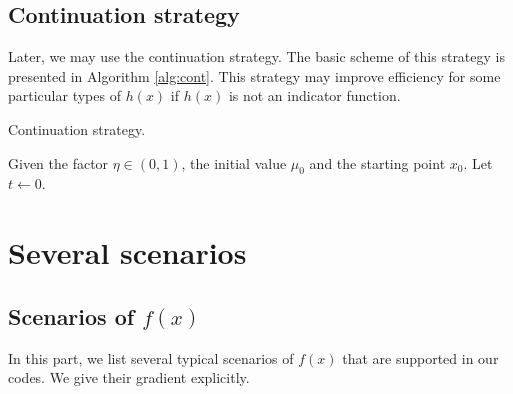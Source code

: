 \documentclass[a4paper]{article}
\begin{document}
  \subsection{Continuation strategy}
  Later, we may use the continuation strategy.
  The basic scheme of this strategy is presented in Algorithm 
  \ref{alg:cont}. This strategy may improve efficiency for some 
  particular types of $h(x)$ if $h(x)$ is not an indicator function.
  \begin{algorithm}[h]
    \caption{Continuation strategy.}
    \label{alg:cont}
    \LinesNumbered
    Given the factor $\eta \in (0,1)$, the initial value $\mu_0$ and 
    the starting point $x_0$. Let $t \leftarrow 0$.\\
  \end{algorithm}
  
  
  
  
  
  
  \section{Several scenarios}
  \label{sec:cal}
  
  \subsection{Scenarios of $f(x)$}
  \label{sec:cal_f}
  In this part, we list several typical scenarios of $f(x)$ that are 
  supported in our codes. We give their gradient explicitly.
  
\end{document}
